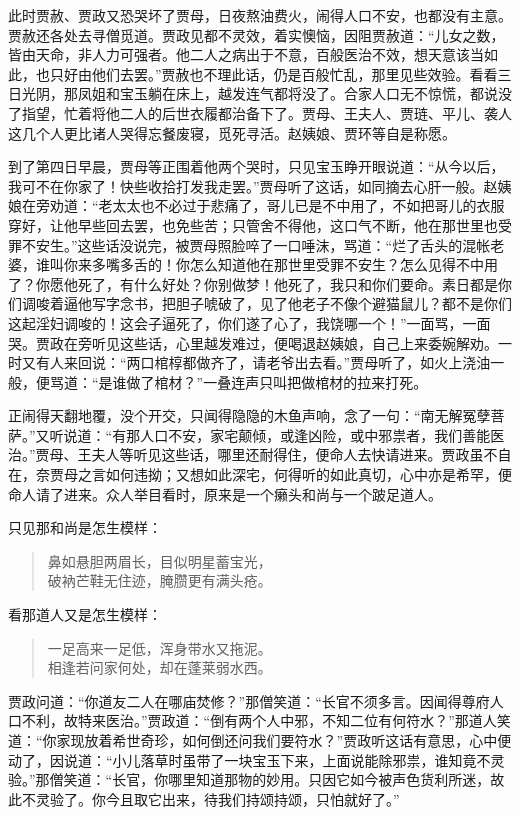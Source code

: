 \documentclass[12pt,oneside]{book}
\newenvironment{shici}{%
\begin{verse}%
\centering\large\hspace{12pt}}%
{\end{verse}}
\begin{document}
此时贾赦、贾政又恐哭坏了贾母，日夜熬油费火，闹得人口不安，也都没有主意。贾赦还各处去寻僧觅道。贾政见都不灵效，着实懊恼，因阻贾赦道：“儿女之数，皆由天命，非人力可强者。他二人之病出于不意，百般医治不效，想天意该当如此，也只好由他们去罢。”贾赦也不理此话，仍是百般忙乱，那里见些效验。看看三日光阴，那凤姐和宝玉躺在床上，越发连气都将没了。合家人口无不惊慌，都说没了指望，忙着将他二人的后世衣履都治备下了。贾母、王夫人、贾琏、平儿、袭人这几个人更比诸人哭得忘餐废寝，觅死寻活。赵姨娘、贾环等自是称愿。

到了第四日早晨，贾母等正围着他两个哭时，只见宝玉睁开眼说道：“从今以后，我可不在你家了！快些收拾打发我走罢。”贾母听了这话，如同摘去心肝一般。赵姨娘在旁劝道：“老太太也不必过于悲痛了，哥儿已是不中用了，不如把哥儿的衣服穿好，让他早些回去罢，也免些苦；只管舍不得他，这口气不断，他在那世里也受罪不安生。”这些话没说完，被贾母照脸啐了一口唾沫，骂道：“烂了舌头的混帐老婆，谁叫你来多嘴多舌的！你怎么知道他在那世里受罪不安生？怎么见得不中用了？你愿他死了，有什么好处？你别做梦！他死了，我只和你们要命。素日都是你们调唆着逼他写字念书，把胆子唬破了，见了他老子不像个避猫鼠儿？都不是你们这起淫妇调唆的！这会子逼死了，你们遂了心了，我饶哪一个！”一面骂，一面哭。贾政在旁听见这些话，心里越发难过，便喝退赵姨娘，自己上来委婉解劝。一时又有人来回说：“两口棺椁都做齐了，请老爷出去看。”贾母听了，如火上浇油一般，便骂道：“是谁做了棺材？”一叠连声只叫把做棺材的拉来打死。

正闹得天翻地覆，没个开交，只闻得隐隐的木鱼声响，念了一句：“南无解冤孽菩萨。”又听说道：“有那人口不安，家宅颠倾，或逢凶险，或中邪祟者，我们善能医治。”贾母、王夫人等听见这些话，哪里还耐得住，便命人去快请进来。贾政虽不自在，奈贾母之言如何违拗；又想如此深宅，何得听的如此真切，心中亦是希罕，便命人请了进来。众人举目看时，原来是一个癞头和尚与一个跛足道人。

只见那和尚是怎生模样：

\begin{shici}
鼻如悬胆两眉长，目似明星蓄宝光，\\
破衲芒鞋无住迹，腌臜更有满头疮。
\end{shici}


看那道人又是怎生模样：

\begin{shici}
一足高来一足低，浑身带水又拖泥。\\
相逢若问家何处，却在蓬莱弱水西。
\end{shici}



贾政问道：“你道友二人在哪庙焚修？”那僧笑道：“长官不须多言。因闻得尊府人口不利，故特来医治。”贾政道：“倒有两个人中邪，不知二位有何符水？”那道人笑道：“你家现放着希世奇珍，如何倒还问我们要符水？”贾政听这话有意思，心中便动了，因说道：“小儿落草时虽带了一块宝玉下来，上面说能除邪祟，谁知竟不灵验。”那僧笑道：“长官，你哪里知道那物的妙用。只因它如今被声色货利所迷，故此不灵验了。你今且取它出来，待我们持颂持颂，只怕就好了。”
\end{document}
